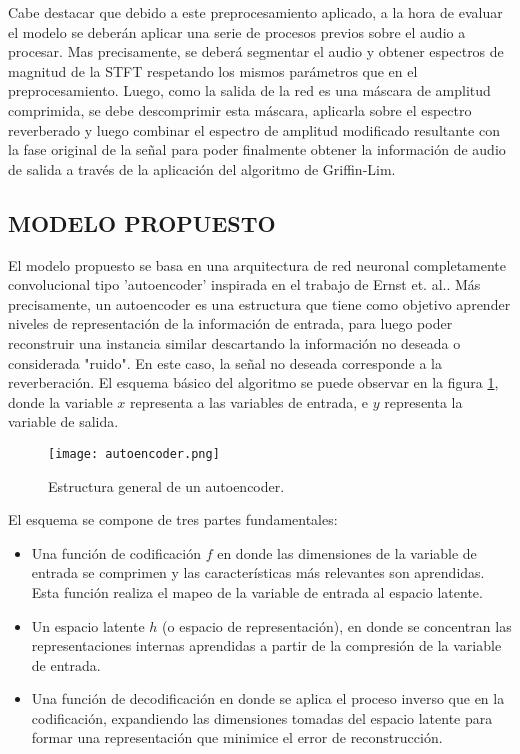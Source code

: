 Cabe destacar que debido a este preprocesamiento aplicado, a la hora de evaluar el modelo se deberán aplicar una serie de procesos previos sobre el audio a procesar. Mas precisamente, se deberá segmentar el audio y obtener espectros de magnitud de la STFT respetando los mismos parámetros que en el preprocesamiento. Luego, como la salida de la red es una máscara de amplitud comprimida, se debe descomprimir esta máscara, aplicarla sobre el espectro reverberado y luego combinar el espectro de amplitud modificado resultante con la fase original de la señal para poder finalmente obtener la información de audio de salida a través de la aplicación del algoritmo de Griffin-Lim.  


\subsection[Modelo propuesto]{MODELO PROPUESTO}

El modelo propuesto se basa en una arquitectura de red neuronal completamente convolucional tipo 'autoencoder' inspirada en el trabajo de Ernst et. al.\cite{FCN}. Más precisamente, un autoencoder es una estructura que tiene como objetivo aprender niveles de representación de la información de entrada, para luego poder reconstruir una instancia similar descartando la información no deseada o considerada "ruido". En este caso, la señal no deseada corresponde a la reverberación. El esquema básico del algoritmo se puede observar en la figura \ref{fig:autoencoder}, donde la variable $x$ representa a las variables de entrada, e $y$ representa la variable de salida. 

\begin{figure}[H]
	\centering{}
	\texttt{[image: autoencoder.png]}
	\caption{Estructura general de un autoencoder.}
	\label{fig:autoencoder}
\end{figure}

El esquema se compone de tres partes fundamentales: 
\begin{itemize}
\item Una función de codificación $f$ en donde las dimensiones de la variable de entrada se comprimen y las características más relevantes son aprendidas. Esta función realiza el mapeo de la variable de entrada al espacio latente. 
\item Un espacio latente $h$ (o espacio de representación), en donde se concentran las representaciones internas aprendidas a partir de la compresión de la variable de entrada. 
\item Una función de decodificación en donde se aplica el proceso inverso que en la codificación, expandiendo las dimensiones tomadas del espacio latente para formar una representación que minimice el error de reconstrucción. 

\end{itemize}

